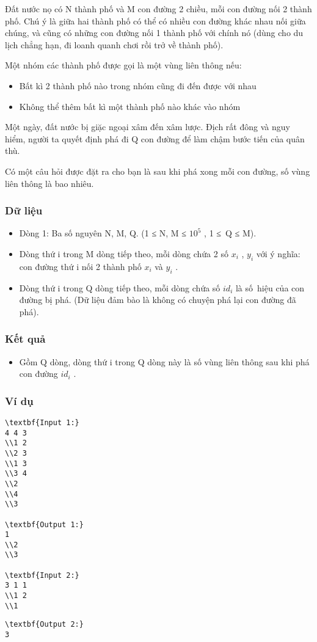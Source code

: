 



   Đất nước nọ có N thành phố và M con đường 2 chiều, mỗi con đường nối 2 thành phố. Chú ý là giữa hai thành phố có thể có nhiều con đường khác nhau nối giữa chúng, và cũng có những con đường nối 1 thành phố với chính nó (dùng cho du lịch chẳng hạn, đi loanh quanh chơi rồi trở về thành phố).  

   Một nhóm các thành phố được gọi là một vùng liên thông nếu:  
\begin{itemize}
	\item     Bất kì 2 thành phố nào trong nhóm cũng đi đến được với nhau   
	\item     Không thể thêm bất kì một thành phố nào khác vào nhóm   
\end{itemize}

   Một ngày, đất nước bị giặc ngoại xâm đến xâm lược. Địch rất đông và nguy hiểm, người ta quyết định phá đi Q con đường để làm chậm bước tiến của quân thù.  

   Có một câu hỏi được đặt ra cho bạn là sau khi phá xong mỗi con đường, số vùng liên thông là bao nhiêu.  

\subsubsection{   Dữ liệu  }
\begin{itemize}
	\item     Dòng 1: Ba số nguyên N, M, Q. (1 ≤ N, M ≤ $10^{5}$    , 1 ≤ Q ≤ M).   
	\item     Dòng thứ i trong M dòng tiếp theo, mỗi dòng chứa 2 số $x_{i}$    , $y_{i}$    với ý nghĩa: con đường thứ i nối 2 thành phố $x_{i}$    và $y_{i}$    .   
	\item     Dòng thứ i trong Q dòng tiếp theo, mỗi dòng chứa số $id_{i}$    là số hiệu của con đường bị phá. (Dữ liệu đảm bào là không có chuyện phá lại con đường đã phá).   
\end{itemize}

\subsubsection{   Kết quả  }
\begin{itemize}
	\item     Gồm Q dòng, dòng thứ i trong Q dòng này là số vùng liên thông sau khi phá con đường $id_{i}$    .   
\end{itemize}

\subsubsection{   Ví dụ  }
\begin{verbatim}
\textbf{Input 1:}
4 4 3
\\1 2
\\2 3
\\1 3
\\3 4
\\2
\\4
\\3

\textbf{Output 1:}
1
\\2
\\3

\textbf{Input 2:}
3 1 1
\\1 2
\\1 \end{verbatim}
\begin{verbatim}
\textbf{Output 2:}
3\end{verbatim}
